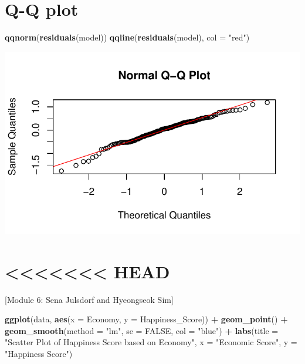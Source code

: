 \documentclass[
  11pt,
]{article}
\newenvironment{Shaded}{\begin{snugshade}}{\end{snugshade}}
\newcommand{\AttributeTok}[1]{\textcolor[rgb]{0.13,0.29,0.53}{#1}}
\newcommand{\ConstantTok}[1]{\textcolor[rgb]{0.56,0.35,0.01}{#1}}
\newcommand{\FunctionTok}[1]{\textcolor[rgb]{0.13,0.29,0.53}{\textbf{#1}}}
\newcommand{\NormalTok}[1]{#1}
\newcommand{\SpecialCharTok}[1]{\textcolor[rgb]{0.81,0.36,0.00}{\textbf{#1}}}
\newcommand{\StringTok}[1]{\textcolor[rgb]{0.31,0.60,0.02}{#1}}
\begin{document}
\section{Q-Q plot}\label{q-q-plot}

\begin{Shaded}
\begin{Highlighting}[]
\FunctionTok{qqnorm}\NormalTok{(}\FunctionTok{residuals}\NormalTok{(model))}
\FunctionTok{qqline}\NormalTok{(}\FunctionTok{residuals}\NormalTok{(model), }\AttributeTok{col =} \StringTok{"red"}\NormalTok{)}
\end{Highlighting}
\end{Shaded}

\begin{center}\includegraphics[width=0.7\linewidth]{Group_project_2_files/figure-latex/unnamed-chunk-40-1} \end{center}

\section{\textless\textless\textless\textless\textless\textless\textless{}
HEAD}\label{head}

{[}Module 6: Sena Julsdorf and Hyeongseok Sim{]}

\begin{Shaded}
\begin{Highlighting}[]
\FunctionTok{ggplot}\NormalTok{(data, }\FunctionTok{aes}\NormalTok{(}\AttributeTok{x =}\NormalTok{ Economy, }\AttributeTok{y =}\NormalTok{ Happiness\_Score)) }\SpecialCharTok{+}
  \FunctionTok{geom\_point}\NormalTok{() }\SpecialCharTok{+}
  \FunctionTok{geom\_smooth}\NormalTok{(}\AttributeTok{method =} \StringTok{"lm"}\NormalTok{, }\AttributeTok{se =} \ConstantTok{FALSE}\NormalTok{, }\AttributeTok{col =} \StringTok{"blue"}\NormalTok{) }\SpecialCharTok{+}
  \FunctionTok{labs}\NormalTok{(}\AttributeTok{title =} \StringTok{"Scatter Plot of Happiness Score based on Economy"}\NormalTok{, }
       \AttributeTok{x =} \StringTok{"Economic Score"}\NormalTok{, }
       \AttributeTok{y =} \StringTok{"Happiness Score"}\NormalTok{)}
\end{Highlighting}
\end{Shaded}
\end{document}

